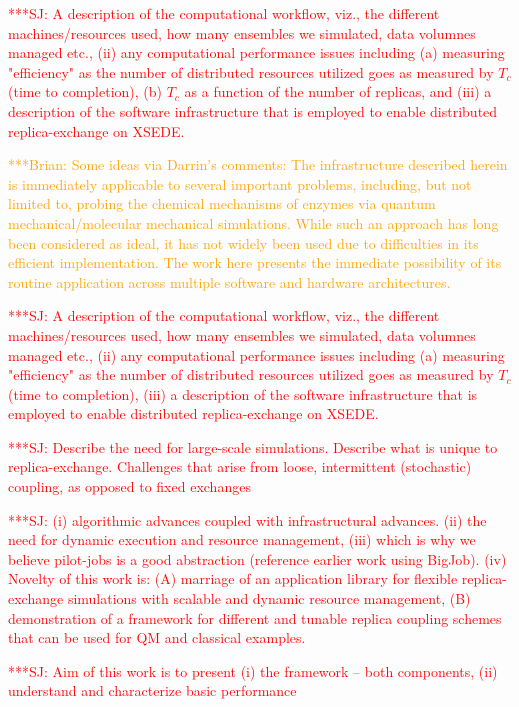 \documentclass{sig-alternate}
\newcommand{\jhanote}[1]{ {\textcolor{red} { ***SJ: #1 }}}
\newcommand{\brnote}[1]{ {\textcolor{Orange} { ***Brian: #1 }}}
\newcommand{\jhanote}[1]{}
\newcommand{\brnote}[1]{ {}}
\begin{document}
\jhanote{ A description of the computational workflow, viz., the
  different
 machines/resources used, how many ensembles we
  simulated, data
 volumnes managed etc., (ii) any computational
  performance issues
 including (a) measuring "efficiency" as the
  number of distributed
 resources utilized goes as measured by $T_c$
  (time to completion),
 (b) $T_c$ as a function of the number of
  replicas, and (iii) a
 description of the software infrastructure
  that is employed to
 enable distributed replica-exchange on XSEDE.}

\brnote{Some ideas via Darrin's comments:
 The infrastructure
  described herein is immediately applicable to several
 important
  problems, including, but not limited to, probing the chemical
  mechanisms of enzymes via quantum mechanical/molecular mechanical 
  simulations. While such an approach has long been considered as
  ideal, it has
 not widely been used due to difficulties in its
  efficient implementation. The
 work here presents the immediate
  possibility of its routine application
 across multiple software
  and hardware architectures.}


\jhanote{A description of the computational workflow, viz., the
  different machines/resources used, how many ensembles we simulated,
  data volumnes managed etc., (ii) any computational performance
  issues including (a) measuring "efficiency" as the number of
  distributed resources utilized goes as measured by $T_c$ (time to
  completion), %
  (iii) a description of the software infrastructure that is employed
  to enable distributed replica-exchange on XSEDE.}

\jhanote{Describe the need for large-scale simulations. Describe what
  is unique to replica-exchange. Challenges that arise from loose,
  intermittent (stochastic) coupling, as opposed to fixed exchanges}


\jhanote{(i) algorithmic advances coupled with infrastructural
  advances. (ii) the need for dynamic execution and resource
  management, (iii) which is why we believe pilot-jobs is a good
  abstraction (reference earlier work using BigJob). (iv) Novelty of
  this work is: (A) marriage of an application library for flexible
  replica-exchange simulations with scalable and dynamic resource
  management, (B) demonstration of a framework for different and
  tunable replica coupling schemes that can be used for QM and
  classical examples.}
 
\jhanote{Aim of this work is to present (i) the framework -- both
  components, (ii) understand and characterize basic performance}
\end{document}

